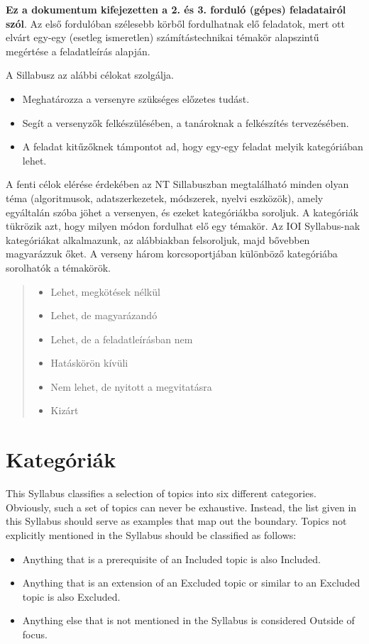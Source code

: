 \documentclass[a4paper,11pt,oneside]{article}
\newcommand{\cmark}{\ding{51}}%
\newcommand{\xmark}{\ding{55}}%
\newcommand{\cincl}{{\small\cmark}}
\newcommand{\cdefi}{{\small\cmark\faFileTextO}}
\newcommand{\ccode}{{\small\cmark\faFileText}}
\newcommand{\cnfoc}{{\small\faQuestion}}
\newcommand{\cemay}{{\small\xmark\faQuestionCircle}}
\newcommand{\cexcl}{{\small\xmark}}
\newcommand{\Iincluded}{\item[\hbox to 1.8em{\cincl\hfill}]}
\newcommand{\Idefine}{\item[\hbox to 1.8em{\cdefi\hfill}]}
\newcommand{\Icodeonly}{\item[\hbox to 1.8em{\ccode\hfill}]}
\newcommand{\Inofocus}{\item[\hbox to 1.8em{\cnfoc\hfill}]}
\newcommand{\Iexmaybe}{\item[\hbox to 1.8em{\cemay\hfill}]}
\newcommand{\Iexcluded}{\item[\hbox to 1.8em{\cexcl\hfill}]}
\newenvironment{myitemize}{\begin{quote}\begin{itemize}\itemsep 0pt}{\end{itemize}\end{quote}}
\begin{document}
\textbf{Ez a dokumentum kifejezetten a 2. és 3. forduló (gépes) feladatairól szól}.
Az első fordulóban szélesebb körből fordulhatnak elő feladatok, mert ott elvárt egy-egy
(esetleg ismeretlen) számítástechnikai témakör alapszintű megértése a feladatleírás alapján.

A Sillabusz az alábbi célokat szolgálja.

\begin{itemize}
\item
Meghatározza a versenyre szükséges előzetes tudást.

\item
Segít a versenyzők felkészülésében, a tanároknak a felkészítés tervezésében.

\item
A feladat kitűzőknek támpontot ad, hogy egy-egy feladat melyik kategóriában lehet.

\end{itemize}

A fenti célok elérése érdekében az NT Sillabuszban megtalálható minden olyan téma
(algoritmusok, adatszerkezetek, módszerek, nyelvi eszközök), amely egyáltalán szóba jöhet a versenyen,
és ezeket kategóriákba soroljuk. A kategóriák tükrözik azt, hogy milyen módon fordulhat elő egy témakör.
Az IOI Syllabus-nak kategóriákat alkalmazunk, az alábbiakban felsoroljuk, majd bővebben magyarázzuk őket.
A verseny három korcsoportjában különböző kategóriába sorolhatók a témakörök.

\begin{myitemize}
\Iincluded Lehet, megkötések nélkül
\Idefine   Lehet, de magyarázandó
\Icodeonly Lehet, de a feladatleírásban nem
\Inofocus  Hatáskörön kívüli
\Iexmaybe  Nem lehet, de nyitott a megvitatásra
\Iexcluded Kizárt
\end{myitemize}



\section{Kategóriák}\label{sec:categories}%

This Syllabus classifies a selection of topics into six different ca\-tegories. 
Obviously, such a set of topics can never be exhaustive.
Instead, the list given in this Syllabus should serve as examples that map out the boundary.
Topics not explicitly mentioned in the Syllabus should be classified as follows:
\begin{itemize}
\itemsep -3pt
\item Anything that is a prerequisite of an Included topic is also Included.
\item Anything that is an extension of an Excluded topic or similar to an Excluded topic is also Excluded.
\item Anything else that is not mentioned in the Syllabus is considered Outside of focus.
\end{itemize}
\end{document}
